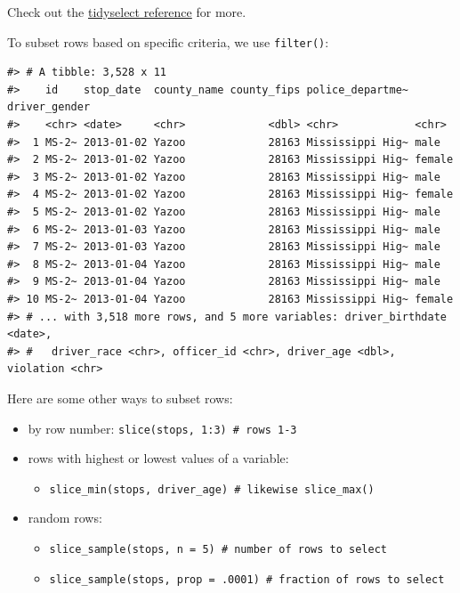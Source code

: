 \documentclass[
]{book}
\providecommand{\tightlist}{%
  \setlength{\itemsep}{0pt}\setlength{\parskip}{0pt}}
\begin{document}
Check out the \href{https://tidyselect.r-lib.org/reference/language.html}{tidyselect reference} for more.

To subset rows based on specific criteria, we use \texttt{filter()}:

\begin{verbatim}
#> # A tibble: 3,528 x 11
#>    id    stop_date  county_name county_fips police_departme~ driver_gender
#>    <chr> <date>     <chr>             <dbl> <chr>            <chr>        
#>  1 MS-2~ 2013-01-02 Yazoo             28163 Mississippi Hig~ male         
#>  2 MS-2~ 2013-01-02 Yazoo             28163 Mississippi Hig~ female       
#>  3 MS-2~ 2013-01-02 Yazoo             28163 Mississippi Hig~ male         
#>  4 MS-2~ 2013-01-02 Yazoo             28163 Mississippi Hig~ female       
#>  5 MS-2~ 2013-01-02 Yazoo             28163 Mississippi Hig~ male         
#>  6 MS-2~ 2013-01-03 Yazoo             28163 Mississippi Hig~ male         
#>  7 MS-2~ 2013-01-03 Yazoo             28163 Mississippi Hig~ male         
#>  8 MS-2~ 2013-01-04 Yazoo             28163 Mississippi Hig~ male         
#>  9 MS-2~ 2013-01-04 Yazoo             28163 Mississippi Hig~ male         
#> 10 MS-2~ 2013-01-04 Yazoo             28163 Mississippi Hig~ female       
#> # ... with 3,518 more rows, and 5 more variables: driver_birthdate <date>,
#> #   driver_race <chr>, officer_id <chr>, driver_age <dbl>, violation <chr>
\end{verbatim}

Here are some other ways to subset rows:

\begin{itemize}
\tightlist
\item
  by row number: \texttt{slice(stops,\ 1:3)\ \#\ rows\ 1-3}
\item
  rows with highest or lowest values of a variable:

  \begin{itemize}
  \tightlist
  \item
    \texttt{slice\_min(stops,\ driver\_age)\ \#\ likewise\ slice\_max()}
  \end{itemize}
\item
  random rows:

  \begin{itemize}
  \tightlist
  \item
    \texttt{slice\_sample(stops,\ n\ =\ 5)\ \#\ number\ of\ rows\ to\ select}
  \item
    \texttt{slice\_sample(stops,\ prop\ =\ .0001)\ \#\ fraction\ of\ rows\ to\ select}
  \end{itemize}
\end{itemize}
\end{document}
